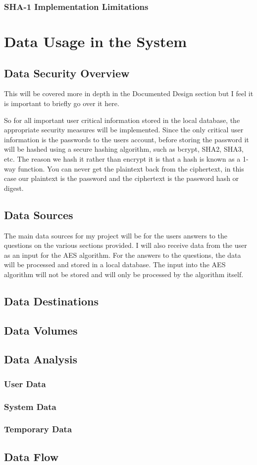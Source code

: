 \subsubsection{SHA-1 Implementation Limitations}

\section{Data Usage in the System}

\subsection{Data Security Overview}
This will be covered more in depth in the Documented Design section but I feel it is important to briefly go over it here.

So for all important user critical information stored in the local database, the appropriate security measures will be implemented. Since the only critical user information is the passwords to the users account, before storing the password it will be hashed using a secure hashing algorithm, such as bcrypt, SHA2, SHA3, etc. The reason we hash it rather than encrypt it is that a hash is known as a 1-way function. You can never get the plaintext back from the ciphertext, in this case our plaintext is the password and the ciphertext is the password hash or digest. 

\subsection{Data Sources}

The main data sources for my project will be for the users answers to the questions on the various sections provided. I will also receive data from the user as an input for the AES algorithm. For the answers to the questions, the data will be processed and stored in a local database. The input into the AES algorithm will not be stored and will only be processed by the algorithm itself. 

\subsection{Data Destinations}


\subsection{Data Volumes}

\subsection{Data Analysis}
\subsubsection{User Data}
\subsubsection{System Data}
\subsubsection{Temporary Data}

\subsection{Data Flow}



